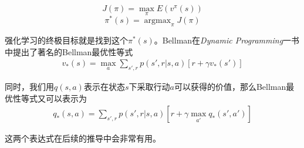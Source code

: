 \documentclass[degree=bachelor, tocarialchapter, pifootnote]{thuthesis}
\DeclareMathOperator*{\argmax}{argmax}
\begin{document}
      $$ J(\pi) = \max_{\pi} E(v^{\pi}(s)) $$
      $$ \pi^*(s) = \argmax_{\pi} J(\pi) $$
    \par 强化学习的终极目标就是找到这个$\pi^*(s)$。Bellman在\textit{Dynamic Programming}一书中提出了著名的Bellman最优性等式\cite{Bellman_DP}
    \begin{align}
       v_*(s) = \max_{a} \sum_{s', r}p(s', r | s, a)[r + \gamma v_*(s')]
    \end{align}
    \par 同时，我们用$q(s, a)$表示在状态$s$下采取行动$a$可以获得的价值，那么Bellman最优性等式又可以表示为
    \begin{align}
       q_*(s, a) = \sum_{s', r}p(s', r | s, a)[r + \gamma \max_{a'} q_*(s', a')]
    \end{align}

    \par 这两个表达式在后续的推导中会非常有用。
    
\end{document}
